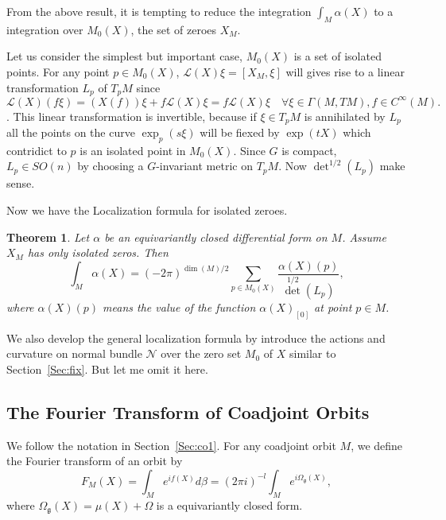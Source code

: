 \documentclass[11pt]{amsart}
\newtheorem{Thm}{Theorem}
\def\cL{{\mathcal{L}}}
\def\cN{{\mathcal{N}}}
\def\fgg{{\mathfrak{g}}}
\begin{document}
From the above result, it is tempting to reduce the integration
$\int_M\alpha(X)$ to a integration over $M_0(X)$, the set of zeroes $X_M$.

Let us consider the simplest but important case, $M_0(X)$ is a set of
isolated points.
For any point $p\in M_0(X)$,
$\cL(X)\xi = [X_M,\xi]$ will gives rise to a linear
transformation $L_p$ of $T_pM$ since 
\[\cL(X)(f\xi) = (X(f))\xi + f\cL(X)\xi = f\cL(X)\xi \quad \forall \xi
\in \Gamma(M,TM), f\in C^\infty(M).
\]. This linear transformation is invertible, because if $\xi\in T_pM$ is
annihilated by $L_p$ all the  points on the curve $\exp_p(s\xi)$ will
be fiexed by $\exp(tX)$ which contridict to  $p$ is an isolated point
in $M_0(X)$.
Since $G$ is compact, $L_p\in SO(n)$ by choosing a $G$-invariant
metric on $T_pM$. Now $\det^{1/2} (L_p)$ make sense.

Now we have the Localization formula for isolated zeroes.
  
\begin{Thm}
Let $\alpha$ be an equivariantly closed differential form
  on $M$. Assume $X_M$ has only isolated zeros. Then
\begin{equation}
\label{eq:localization}
\int_M \alpha(X) = (-2\pi)^{\dim(M)/2}\sum_{p\in M_0(X)}\frac{\alpha(X)(p)}{\det^{1/2}(L_p)},
\end{equation}
where $\alpha(X)(p)$ means the value of the function $\alpha(X)_{[0]}$
at point $p\in M$.
\end{Thm}

We also develop the general localization formula by introduce the 
actions and curvature on normal bundle $\cN$ over the zero set $M_0$ 
of $X$ similar to Section~\ref{Sec:fix}. But let me omit it here.

\subsection{The Fourier Transform of Coadjoint Orbits}
We follow the notation in Section~\ref{Sec:co1}.
For any coadjoint orbit $M$, we define the Fourier transform of an orbit
by 
\[
F_M(X) = \int_M e^{i f(X)}d\beta = (2\pi i )^{-l}\int_Me^{i\Omega_\fgg(X)}, 
\]
where $\Omega_\fgg(X) = \mu(X) + \Omega$ is a equivariantly closed form.
\end{document}
